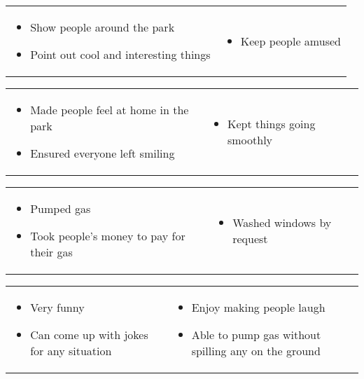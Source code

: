 \documentclass[letterpaper,10pt]{resume}
\begin{document}
	\begin{body}
		\begin{tabular}{p{} p{}}
			\begin{itemize}
			\item Show people around the park
			\item Point out cool and interesting things
			\end{itemize}
		&
			\begin{itemize}
			\item Keep people amused
			\end{itemize}
		\end{tabular}
		\begin{tabular}{p{} p{}}
			\begin{itemize}
			\item Made people feel at home in the park
			\item Ensured everyone left smiling
			\end{itemize}
		&
			\begin{itemize}
			\item Kept things going smoothly
			\end{itemize}
		\end{tabular}
		
		\begin{tabular}{p{} p{}}
			\begin{itemize}
			\item Pumped gas
			\item Took people's money to pay for their gas
			\end{itemize}
		&
			\begin{itemize}
			\item Washed windows by request
			\end{itemize}
		\end{tabular}
	\end{body}

	\begin{body}
		\begin{tabular}{p{} p{0.5\textwidth}}
		\begin{itemize}
		\item Very funny
		\item Can come up with jokes for any situation
		\end{itemize}
		&
		\begin{itemize}
		\item Enjoy making people laugh
		\item Able to pump gas without spilling any on the ground
		\end{itemize}
		\end{tabular}
	\end{body}
\end{document}
